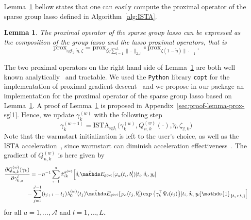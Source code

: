 \documentclass[11pt]{article}
\newtheorem{lemma}{Lemma}
\newcommand{\ind}[1]{\mathds{1}_{#1}}
\newcommand{\norm}[1]{\|#1\|}
\newcommand{\E}{\mathds E}
\begin{document}
\vspace{.5cm}
Lemma~\ref{lemma:prox-sgl1} bellow states that one can easily compute the proximal operator of the sparse group lasso defined in Algorithm~\ref{alg:ISTA}.
\begin{lemma}
\label{lemma:prox-sgl1}
The proximal operator of the sparse group lasso can be expressed as the composition of the group lasso and the lasso proximal operators, that is
\normalfont
\begin{equation*}
  \text{prox}_{\text{sg} l_1,\tilde \eta, \zeta} = \text{prox}_{\zeta \tilde \eta \sum_{l=1}^L \norm{\cdot}_{2,l}} \circ \text{prox}_{\zeta (1 - \tilde \eta) \norm{\cdot}_1}.
\end{equation*}
\end{lemma}
The two proximal operators on the right hand side of Lemma~\ref{lemma:prox-sgl1} are both well known analytically~\citep{bach2011optimization} and tractable. We used the \texttt{Python} library \texttt{copt} for the implementation of proximal gradient descent~\citep{copt} and we propose in our package an implementation for the proximal operator of the sparse group lasso based on Lemma~\ref{lemma:prox-sgl1}.
A proof of Lemma~\ref{lemma:prox-sgl1} is proposed in Appendix~\ref{sec:proof-lemma-prox-sgl1}.
Hence, we update $\gamma_k^{(w)}$ with the following step
\begin{equation}
  \label{eq:gamma-update}
  \gamma_k^{(w+1)} = \text{ISTA}_{\text{sg} l_1}\big(\gamma_k^{(w)}, Q^{(w)}_{n,k}(\cdot), \tilde \eta, \zeta_{2,k}\big)
\end{equation}
Note that the warmstart initialization is left to the user's choice, as well as the ISTA acceleration~\citep{beck2009fast}, since warmstart can diminish acceleration effectiveness~\citep{tibshirani2010proximal}. The gradient of $Q_{n,k}^{(w)}$ is here given by
\begin{align}
  \label{eq:grad-Q-2}
  &\frac{\partial Q_{n,k}^{(w)}(\gamma_k)}{\partial \gamma_{k,a}^l} = -n^{-1} \sum_{i=1}^n \hat \pi_{ik}^{\theta^{(w)}} \Big[ \delta_i  \hat \E_{\theta^{(w)}}[ \varphi_a(t_i, b_i^l) | t_i, \delta_i, y_i] \\ \nonumber
   &\qquad\qquad - \sum_{j=1}^{J-1} (t_{j+1}-t_j) \lambda_0^{(w)}(t_j) \hat \E_{\theta^{(w)}}[ \varphi_a(t_j, b_i^l) \exp \big\{\gamma_k^\top \Psi_i(t_j)\big\} | t_i, \delta_i, y_i] \ind{\{t_j < t_i\}} \Big]
\end{align}
for all $a = 1, \ldots, \mathcal{A}$ and $l = 1, \ldots, L$.
\end{document}
